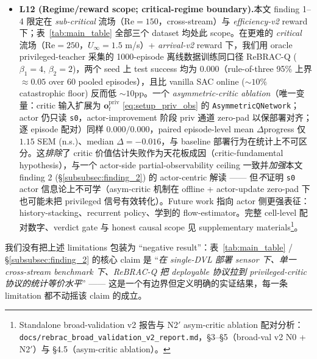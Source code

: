 \begin{itemize}
    \item \textbf{L12 (Regime/reward scope; critical-regime boundary).}\quad 本文 finding 1--4 限定在 \emph{sub-critical} 流场（$\mathrm{Re} = 150$，cross-stream）与 \emph{efficiency-v2} reward 下；表~\ref{tab:main_table} 全部三个 dataset 均处此 scope。在更难的 \emph{critical} 流场（$\mathrm{Re} = 250$，$U_\infty = 1.5$ m/s）+ \emph{arrival-v2} reward 下，我们用 oracle privileged-teacher 采集的 1000-episode 离线数据训练同口径 ReBRAC-Q ($\beta_1 = 4$, $\beta_2 = 2$)，两个 seed 上 test success 均为 $0.000$（rule-of-three 95\% 上界 $\approx 0.05$ over $60$ pooled episodes），且比 vanilla SAC online ($\sim 10\%$ catastrophic floor) 反而低 $\sim 10$pp。一个 \emph{asymmetric-critic ablation}（唯一变量：critic 输入扩展为 $\mathbf{o}_t^{\mathrm{priv}}$ \eqref{eq:setup_priv_obs} 的 \texttt{AsymmetricQNetwork}；actor 仍只读 \texttt{s0}，actor-improvement 阶段 priv 通道 zero-pad 以保部署对齐；逐 episode 配对）同样 $0.000/0.000$，paired episode-level mean $\Delta$progress 仅 $1.15$ SEM (n.s.)、median $\Delta = -0.016$，与 baseline 部署行为在统计上不可区分。这\emph{排除}了 critic 价值估计失败作为天花板成因（critic-fundamental hypothesis），与一个 actor-side partial-observability ceiling 一致并\emph{加强}本文 finding 2 (\S\ref{subsubsec:finding_2}) 的 actor-centric 解读 —— 但\emph{不}证明 \texttt{s0} actor 信息论上不可学（asym-critic 机制在 offline + actor-update zero-pad 下也可能未把 privileged 信号有效转化）。Future work 指向 actor 侧更强表征：history-stacking、recurrent policy、学到的 flow-estimator。完整 cell-level 配对数字、verdict gate 与 honest causal scope 见 supplementary materials\footnote{Standalone broad-validation v2 报告与 N2$'$ asym-critic ablation 配对分析：\texttt{docs/rebrac\_broad\_validation\_v2\_report.md}，\S 3--\S 5（broad-val v2 N0 + N2$'$）与 \S 4.5（asym-critic ablation）。}。
\end{itemize}

我们没有把上述 limitations 包装为 ``negative result''：表~\ref{tab:main_table} / \S\ref{subsubsec:finding_2} 的核心 claim 是 ``\emph{在 single-DVL 部署 sensor 下、单一 cross-stream benchmark 下、ReBRAC-Q 把 deployable 协议拉到 privileged-critic 协议的统计等价水平}'' —— 这是一个有边界但定义明确的实证结果，每一条 limitation 都不动摇该 claim 的成立。
